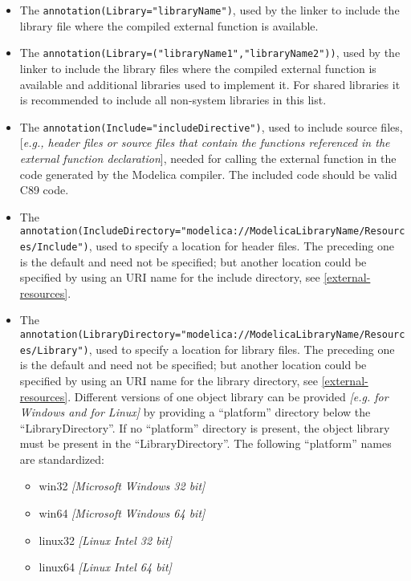 \begin{itemize}
\item
  The \lstinline!annotation(Library="libraryName")!, used by the linker to include
  the library file where the compiled external function is available.
\item
  The \lstinline!annotation(Library=("libraryName1","libraryName2"))!, used by the
  linker to include the library files where the compiled external
  function is available and additional libraries used to implement it.
  For shared libraries it is recommended to include all non-system
  libraries in this list.
\item
  The \lstinline!annotation(Include="includeDirective")!, used to include source
  files, {[}\emph{e.g., header files or source files that contain the
  functions referenced in the external function declaration}{]}, needed
  for calling the external function in the code generated by the
  Modelica compiler. The included code should be valid C89 code.
\item
  The
  \lstinline!annotation(IncludeDirectory="modelica://ModelicaLibraryName/Resources/Include")!,
  used to specify a location for header files. The preceding one is the
  default and need not be specified; but another location could be
  specified by using an URI name for the include directory, see \autoref{external-resources}.
\item
  The
  \lstinline!annotation(LibraryDirectory="modelica://ModelicaLibraryName/Resources/Library")!,
  used to specify a location for library files. The preceding one is the
  default and need not be specified; but another location could be
  specified by using an URI name for the library directory, see \autoref{external-resources}.
  Different versions of one object library can be provided
  \emph{{[}e.g. for Windows and for Linux{]}} by providing a
  ``platform'' directory below the ``LibraryDirectory''. If no
  ``platform'' directory is present, the object library must be present
  in the ``LibraryDirectory''. The following ``platform'' names are
  standardized:

  \begin{itemize}
  \item
    win32 \emph{{[}Microsoft Windows 32 bit{]}}
  \item
    win64 \emph{{[}Microsoft Windows 64 bit{]}}
  \item
    linux32 \emph{{[}Linux Intel 32 bit{]}}
  \item
    linux64 \emph{{[}Linux Intel 64 bit{]}}
  \end{itemize}
\end{itemize}

